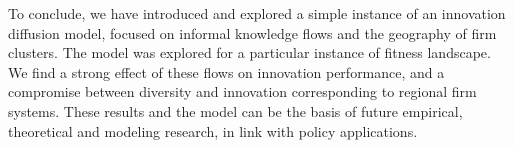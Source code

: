 \documentclass[letterpaper]{article}
\begin{document}
To conclude, we have introduced and explored a simple instance of an innovation diffusion model, focused on informal knowledge flows and the geography of firm clusters. The model was explored for a particular instance of fitness landscape. We find a strong effect of these flows on innovation performance, and a compromise between diversity and innovation corresponding to regional firm systems. These results and the model can be the basis of future empirical, theoretical and modeling research, in link with policy applications.






\footnotesize


\end{document}
